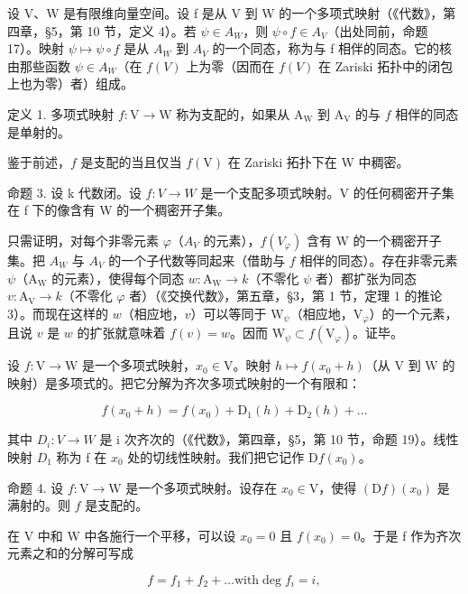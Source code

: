 
设 V、W 是有限维向量空间。设 f 是从 V 到 W 的一个多项式映射（《代数》，第四章，§5，第 10 节，定义 4）。若 \(\psi \in A_{W}\)，则 \(\psi \circ f \in A_{V}\)（出处同前，命题 17）。映射 \(\psi \mapsto \psi \circ f\) 是从 \(A_{W}\) 到 \(A_{V}\) 的一个同态，称为与 f 相伴的同态。它的核由那些函数 \(\psi \in A_{W}\)（在 \(f(V)\) 上为零（因而在 \(f(V)\) 在 Zariski 拓扑中的闭包上也为零）者）组成。

定义 1. 多项式映射 \(f: \mathrm{V} \to \mathrm{W}\) 称为支配的，如果从 \(\mathrm{A_W}\) 到 \(\mathrm{A_V}\) 的与 \(f\) 相伴的同态是单射的。

鉴于前述，\(f\) 是支配的当且仅当 \(f(\mathrm{V})\) 在 Zariski 拓扑下在 W 中稠密。

命题 3. 设 k 代数闭。设 \(f : V \to W\) 是一个支配多项式映射。V 的任何稠密开子集在 f 下的像含有 W 的一个稠密开子集。

只需证明，对每个非零元素 \(\varphi\)（\(A_{V}\) 的元素），\(f(V_{\varphi})\) 含有 W 的一个稠密开子集。把 \(A_{W}\) 与 \(A_{V}\) 的一个子代数等同起来（借助与 \(f\) 相伴的同态）。存在非零元素 \(\psi\)（\(\mathrm{A_W}\) 的元素），使得每个同态 \(w: \mathrm{A_W} \to k\)（不零化 \(\psi\) 者）都扩张为同态 \(v: \mathrm{A_V} \to k\)（不零化 \(\varphi\) 者）（《交换代数》，第五章，§3，第 1 节，定理 1 的推论 3）。而现在这样的 \(w\)（相应地，\(v\)）可以等同于 \(\mathrm{W}_{\psi}\)（相应地，\(\mathrm{V}_{\varphi}\)）的一个元素，且说 \(v\) 是 \(w\) 的扩张就意味着 \(f(v) = w\)。因而 \(\mathrm{W}_{\psi} \subset f(\mathrm{V}_{\varphi})\)。证毕。

设 \(f: \mathrm{V} \to \mathrm{W}\) 是一个多项式映射，\(x_0 \in \mathrm{V}\)。映射 \(h \mapsto f(x_0 + h)\)（从 \(\mathrm{V}\) 到 \(\mathrm{W}\) 的映射）是多项式的。把它分解为齐次多项式映射的一个有限和：

\[
f (x _ {0} + h) = f (x _ {0}) + \mathrm{D} _ {1} (h) + \mathrm{D} _ {2} (h) + \dots
\]

其中 \(D_{i}: V \to W\) 是 i 次齐次的（《代数》，第四章，§5，第 10 节，命题 19）。线性映射 \(D_{1}\) 称为 f 在 \(x_{0}\) 处的切线性映射。我们把它记作 \(\mathrm{D}f(x_{0})\)。

命题 4. 设 \(f: \mathrm{V} \to \mathrm{W}\) 是一个多项式映射。设存在 \(x_0 \in \mathrm{V}\)，使得 \((\mathrm{D}f)(x_0)\) 是满射的。则 \(f\) 是支配的。

在 V 中和 W 中各施行一个平移，可以设 \(x_{0} = 0\) 且 \(f(x_{0}) = 0\)。于是 f 作为齐次元素之和的分解可写成

\[
f = f _ {1} + f _ {2} + \dots \text {with} \deg f _ {i} = i,
\]

